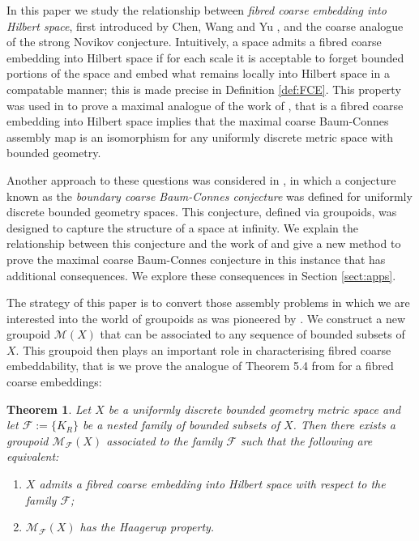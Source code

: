 \documentclass[11pt]{amsart}
\theoremstyle{plain}
\newtheorem{theorem}{Theorem}%
\theoremstyle{definition}%
\theoremstyle{remark}%
\begin{document}
In this paper we study the relationship between \textit{fibred coarse embedding into Hilbert space}, first introduced by Chen, Wang and Yu \cite{FCEpaper}, and the coarse analogue of the strong Novikov conjecture. Intuitively, a space admits a fibred coarse embedding into Hilbert space if for each scale it is acceptable to forget bounded portions of the space and embed what remains locally into Hilbert space in a compatable manner; this is made precise in Definition \ref{def:FCE}. This property was used in \cite{FCEpaper} to prove a maximal analogue of the work of \cite{MR1728880}, that is a fibred coarse embedding into Hilbert space implies that the maximal coarse Baum-Connes assembly map is an isomorphism for any uniformly discrete metric space with bounded geometry.

Another approach to these questions was considered in \cite{mypub1}, in which a conjecture known as the \textit{boundary coarse Baum-Connes conjecture} was defined for uniformly discrete bounded geometry spaces. This conjecture, defined via groupoids, was designed to capture the structure of a space at infinity. We explain the relationship between this conjecture and the work of \cite{FCEpaper} and give a new method to prove the maximal coarse Baum-Connes conjecture in this instance that has additional consequences. We explore these consequences in Section \ref{sect:apps}.

The strategy of this paper is to convert those assembly problems in which we are interested into the world of groupoids as was pioneered by \cite{MR1905840}. We construct a new groupoid $\mathcal{M}(X)$ that can be associated to any sequence of bounded subsets of $X$. This groupoid then plays an important role in characterising fibred coarse embeddability, that is we prove the analogue of Theorem 5.4 from \cite{MR1905840} for a fibred coarse embeddings: 

\begin{theorem}\label{Thm:MR1}
Let $X$ be a uniformly discrete bounded geometry metric space and let $\mathcal{F}:=\lbrace K_{R} \rbrace$ be a nested family of bounded subsets of $X$. Then there exists a groupoid $\mathcal{M}_{\mathcal{F}}(X)$ associated to the family $\mathcal{F}$ such that the following are equivalent:
\begin{enumerate}
\item $X$ admits a fibred coarse embedding into Hilbert space with respect to the family $\mathcal{F}$;
\item$\mathcal{M}_{\mathcal{F}}(X)$ has the Haagerup property.
\end{enumerate}
\end{theorem}
\end{document}
